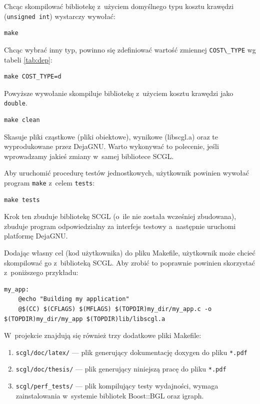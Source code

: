 \documentclass[a4paper,12pt,polish,oneside,openright]{thesis}
\newcommand\code[1]{\lstinline[style=line]{#1}}
\begin{document}
Chcąc skompilować bibliotekę z~użyciem domyślnego typu kosztu krawędzi (\code{unsigned int}) wystarczy wywołać:
\begin{lstlisting}[style=coden]
make
\end{lstlisting}
Chcąc wybrać inny typ, powinno się zdefiniować wartość zmiennej \code{COST\_TYPE} wg tabeli \ref{tab:dep}:
\begin{lstlisting}[style=coden]
make COST_TYPE=d
\end{lstlisting}
Powyższe wywołanie skompiluje bibliotekę z~użyciem kosztu krawędzi jako \code{double}.

\begin{lstlisting}[style=coden]
make clean
\end{lstlisting}
Skasuje pliki cząstkowe (pliki obiektowe), wynikowe (libscgl.a) oraz te wyprodukowane przez DejaGNU.
Warto wykonywać to polecenie, jeśli wprowadzamy jakieś zmiany w~samej bibliotece SCGL.

Aby uruchomić procedurę testów jednostkowych, użytkownik powinien wywołać program \code{make} z~celem \code{tests}:
\begin{lstlisting}[style=coden]
make tests
\end{lstlisting}
Krok ten zbuduje bibliotekę SCGL (o~ile nie została wcześniej zbudowana), zbuduje program odpowiedzialny za interfejs testowy a~następnie uruchomi platformę DejaGNU.

Dodając własny cel (kod użytkownika) do pliku Makefile, użytkownik może chcieć skompilować go z~biblioteką SCGL.
Aby zrobić to poprawnie powinien skorzystać z~poniższego przykładu:
\begin{lstlisting}[style=coden]
my_app:
	@echo "Building my application"
	@$(CC) $(CFLAGS) $(MFLAGS) $(TOPDIR)my_dir/my_app.c -o $(TOPDIR)my_dir/my_app $(TOPDIR)lib/libscgl.a
\end{lstlisting}

W~projekcie znajdują się również trzy dodatkowe pliki Makefile:
\begin{enumerate}
	\item \code{scgl/doc/latex/} --- plik generujący dokumentację doxygen do pliku \code{*.pdf}
	\item \code{scgl/doc/thesis/} --- plik generujący niniejszą pracę do pliku \code{*.pdf}
	\item \code{scgl/perf_tests/} --- plik kompilujący testy wydajności, wymaga zainstalowania w~systemie bibliotek Boost::BGL oraz igraph.
\end{enumerate}
\end{document}
